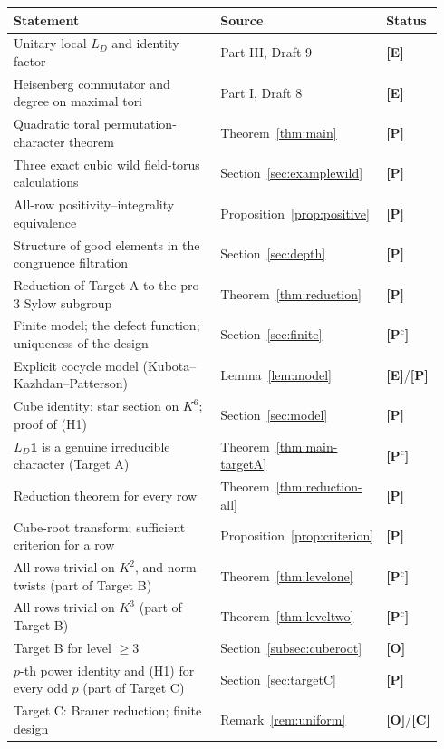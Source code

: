 \documentclass[11pt]{article}
\newcommand{\Ptag}{\textnormal{\textbf{[P]}}}
\newcommand{\Pctag}{\textnormal{\textbf{[P$^{\mathrm c}$]}}}
\newcommand{\Etag}{\textnormal{\textbf{[E]}}}
\newcommand{\Otag}{\textnormal{\textbf{[O]}}}
\newcommand{\Ctag}{\textnormal{\textbf{[C]}}}
\theoremstyle{plain}
\theoremstyle{definition}
\begin{document}
\begin{center}\small
\begin{tabular}{@{}p{0.60\linewidth}p{0.26\linewidth}p{0.08\linewidth}@{}}
\toprule
Statement & Source & Status\\\midrule
Unitary local $L_D$ and identity factor & Part III, Draft 9 & \Etag\\
Heisenberg commutator and degree on maximal tori & Part I, Draft 8 & \Etag\\
Quadratic toral permutation-character theorem & Theorem~\ref{thm:main} & \Ptag\\
Three exact cubic wild field-torus calculations & Section~\ref{sec:examplewild} & \Ptag\\
All-row positivity--integrality equivalence & Proposition~\ref{prop:positive} & \Ptag\\
Structure of good elements in the congruence filtration & Section~\ref{sec:depth} & \Ptag\\
Reduction of Target A to the pro-$3$ Sylow subgroup & Theorem~\ref{thm:reduction} & \Ptag\\
Finite model; the defect function; uniqueness of the design & Section~\ref{sec:finite} & \Pctag\\
Explicit cocycle model (Kubota--Kazhdan--Patterson) & Lemma~\ref{lem:model} & \Etag/\Ptag\\
Cube identity; star section on $K^6$; proof of (H1) & Section~\ref{sec:model} & \Ptag\\
$L_D\mathbf1$ is a genuine irreducible character (Target A) & Theorem~\ref{thm:main-targetA} & \Pctag\\
Reduction theorem for every row & Theorem~\ref{thm:reduction-all} & \Ptag\\
Cube-root transform; sufficient criterion for a row & Proposition~\ref{prop:criterion} & \Ptag\\
All rows trivial on $K^2$, and norm twists (part of Target B) & Theorem~\ref{thm:levelone} & \Pctag\\
All rows trivial on $K^3$ (part of Target B) & Theorem~\ref{thm:leveltwo} & \Pctag\\
Target B for level $\ge3$ & Section~\ref{subsec:cuberoot} & \Otag\\
$p$-th power identity and (H1) for every odd $p$ (part of Target C) & Section~\ref{sec:targetC} & \Ptag\\
Target C: Brauer reduction; finite design & Remark~\ref{rem:uniform} & \Otag/\Ctag\\
\bottomrule
\end{tabular}
\end{center}
\end{document}
